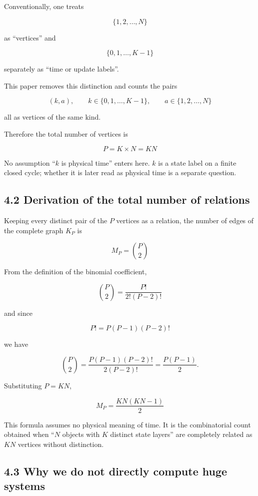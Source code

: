 \documentclass[
  a4paper,
]{article}
\begin{document}
Conventionally, one treats

\[
\{1,2,\ldots,N\}
\]

as ``vertices'' and

\[
\{0,1,\ldots,K-1\}
\]

separately as ``time or update labels''.

This paper removes this distinction and counts the pairs

\[
(k,a),
\qquad
k\in\{0,1,\ldots,K-1\},
\qquad
a\in\{1,2,\ldots,N\}
\]

all as vertices of the same kind.

Therefore the total number of vertices is

\[
P
=
K\times N
=
KN
\]

No assumption ``\(k\) is physical time'' enters here. \(k\) is a state
label on a finite closed cycle; whether it is later read as physical
time is a separate question.

\subsection{4.2 Derivation of the total number of
relations}\label{derivation-of-the-total-number-of-relations}

Keeping every distinct pair of the \(P\) vertices as a relation, the
number of edges of the complete graph \(K_P\) is

\[
M_P
=
\binom{P}{2}
\]

From the definition of the binomial coefficient,

\[
\binom{P}{2}
=
\frac{P!}{2!(P-2)!}
\]

and since

\[
P!
=
P(P-1)(P-2)!
\]

we have

\[
\binom{P}{2}
=
\frac{P(P-1)(P-2)!}{2(P-2)!}
=
\frac{P(P-1)}{2}.
\]

Substituting \(P=KN\),

\[
\boxed{
M_P
=
\frac{KN(KN-1)}{2}
}
\]

This formula assumes no physical meaning of time. It is the
combinatorial count obtained when ``\(N\) objects with \(K\) distinct
state layers'' are completely related as \(KN\) vertices without
distinction.

\subsection{4.3 Why we do not directly compute huge
systems}\label{why-we-do-not-directly-compute-huge-systems}
\end{document}
